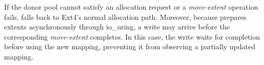 If the donor pool cannot satisfy an allocation request or a \emph{move-extent} operation fails, \odes falls back to Ext4's normal allocation path. Moreover, because \odes prepares extents asynchronously
through io\_uring, a write may arrive before the corresponding
\emph{move-extent} completes. In this case, the write waits for completion
before using the new mapping, preventing it from observing a partially
updated mapping.

